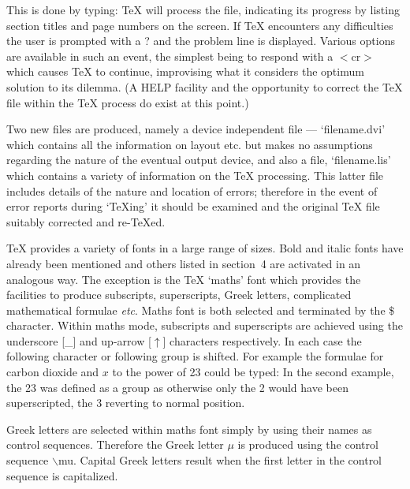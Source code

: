
This is done by typing:
\medskip
{}
{\TeX} will process the file, indicating its progress by
listing section titles and page numbers on the screen.
If {\TeX} encounters any difficulties the user is prompted with a ?
and the problem line is displayed.
Various options are available in such an event, the simplest being to
respond with a $<$cr$>$ which causes {\TeX} to continue, improvising what it
considers the optimum solution to its dilemma.
(A HELP facility and the opportunity to
correct the {\TeX} file within the {\TeX} process do exist at this point.)

Two new files
are produced, namely a device independent file --- `filename.dvi' which
contains all the information on layout etc. but makes no assumptions
regarding the nature of the eventual output device, and
also a file, `filename.lis' which contains a variety of information on
the {\TeX} processing.
This latter file includes details of the nature and location of errors;
therefore in the event of error reports during `\TeX ing' it should be
examined and the original {\TeX} file suitably corrected and re-\TeX ed.




\nobreak
{}
\nobreak

{\TeX} provides a variety of fonts in a large range of sizes.
Bold and italic fonts have already been mentioned and others listed
in section~4 are activated in an analogous way.
The exception is the {\TeX} `maths' font which provides the facilities to
produce subscripts, superscripts, Greek letters, complicated mathematical
formulae {\it etc}.
Maths font is both selected and terminated by the \$ character.
Within maths mode, subscripts and superscripts are achieved using
the underscore [\_]
and up-arrow [$\uparrow$] characters respectively.
In each case the following character or following group is shifted.
For example the formulae for carbon dioxide and $x$ to the power of 23 could
be typed:
\medskip
{}
In the second example, the 23 was defined as a group as otherwise only
the 2 would have been superscripted, the 3 reverting to normal position.

Greek letters are selected within maths font simply by using their names
as control sequences.
Therefore the Greek letter $\mu$ is produced using the control
sequence $\backslash$mu.
Capital Greek letters result when the first letter in the control sequence
is capitalized.

